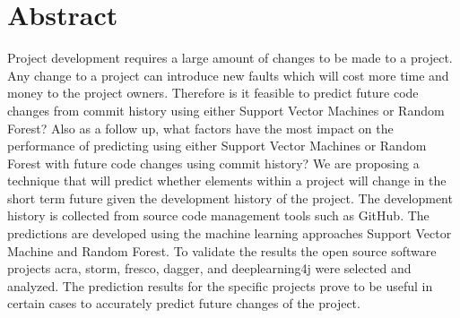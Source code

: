 \chapter*{Abstract}

Project development requires a large amount of changes to be made to a project. Any change to a project can introduce new faults which will cost more time and money to the project owners. Therefore is it feasible to predict future code changes from commit history using either Support Vector Machines or Random Forest? Also as a follow up, what factors have the most impact on the performance of predicting using either Support Vector Machines or Random Forest with future code changes using commit history? We are proposing a technique that will predict whether elements within a project will change in the short term future given the development history of the project. The development history is collected from source code management tools such as GitHub. The predictions are developed using the machine learning approaches Support Vector Machine and Random Forest. To validate the results the open source software projects acra, storm, fresco, dagger, and deeplearning4j were selected and analyzed. The prediction results for the specific projects prove to be useful in certain cases to accurately predict future changes of the project.

